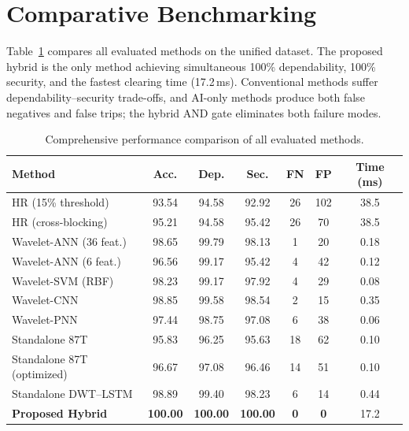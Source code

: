 \documentclass[12pt,a4paper,oneside]{report}
\begin{document}
\section{Comparative Benchmarking}
Table~\ref{tab:6.14} compares all evaluated methods on the unified dataset. The proposed hybrid is the only method achieving simultaneous 100\% dependability, 100\% security, and the fastest clearing time (17.2\,ms). Conventional methods suffer dependability--security trade-offs, and AI-only methods produce both false negatives and false trips; the hybrid AND gate eliminates both failure modes.
\begin{table}[H]\centering\caption{Comprehensive performance comparison of all evaluated methods.}\label{tab:6.14}
\small\begin{tabular}{@{}lcccccc@{}}\toprule
\textbf{Method} & \textbf{Acc.} & \textbf{Dep.} & \textbf{Sec.} & \textbf{FN} & \textbf{FP} & \textbf{Time (ms)}\\ \midrule
HR (15\% threshold) & 93.54 & 94.58 & 92.92 & 26 & 102 & 38.5\\
HR (cross-blocking) & 95.21 & 94.58 & 95.42 & 26 & 70 & 38.5\\
Wavelet-ANN (36 feat.) & 98.65 & 99.79 & 98.13 & 1 & 20 & 0.18\\
Wavelet-ANN (6 feat.) & 96.56 & 99.17 & 95.42 & 4 & 42 & 0.12\\
Wavelet-SVM (RBF) & 98.23 & 99.17 & 97.92 & 4 & 29 & 0.08\\
Wavelet-CNN & 98.85 & 99.58 & 98.54 & 2 & 15 & 0.35\\
Wavelet-PNN & 97.44 & 98.75 & 97.08 & 6 & 38 & 0.06\\
Standalone 87T & 95.83 & 96.25 & 95.63 & 18 & 62 & 0.10\\
Standalone 87T (optimized) & 96.67 & 97.08 & 96.46 & 14 & 51 & 0.10\\
Standalone DWT--LSTM & 98.89 & 99.40 & 98.23 & 6 & 14 & 0.44\\
\textbf{Proposed Hybrid} & \textbf{100.00} & \textbf{100.00} & \textbf{100.00} & \textbf{0} & \textbf{0} & 17.2\\ \bottomrule
\end{tabular}\end{table}
\end{document}
